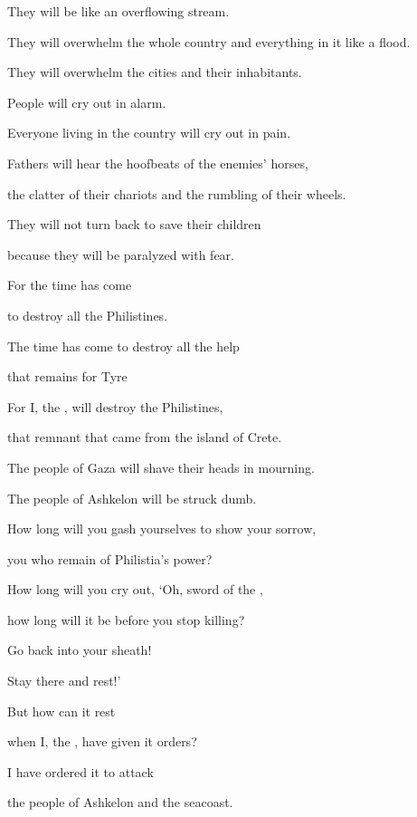 {\par }{\Q They will be
like an overflowing
stream.
\par }{\Q They will overwhelm
the whole country
and everything
in it like a flood.
\par }{\Q They will overwhelm the cities
and their inhabitants.
\par }{\Q People
will cry
out in alarm.
\par }{\Q Everyone
living
in the country
will cry out in pain.
\par }{\Q {}Fathers
will hear
the hoofbeats
of the enemies’ horses,
\par }{\Q the clatter
of their chariots
and the rumbling
of their wheels.
\par }{\Q They will not
turn back
to
save their children
\par }{\Q because they will be paralyzed
with fear.
\par }{\Q {}For
the time
has come
\par }{\Q to destroy
all
the Philistines.
\par }{\Q The time has come to destroy
all
the help
\par }{\Q that remains
for Tyre
\par }{\Q For
I, the
{}, will destroy
the Philistines,
\par }{\Q that remnant
that came from the island
of Crete.
\par }{\Q {}The people of Gaza
will shave
their heads in mourning.
\par }{\Q The people of Ashkelon
will be struck dumb.
\par }{\Q How
long
will you gash
yourselves to show your sorrow,

\par }{\Q you who remain
of Philistia’s power?
\par }{\Q {}How long
will you cry out, ‘Oh,
sword
of the
{},
\par }{\Q how long
will it be before you stop killing?

\par }{\Q Go back
into
your sheath!
\par }{\Q Stay
there and rest!’
\par }{\Q {}But how
can it rest
\par }{\Q when I, the
{}, have given it orders?
\par }{\Q I have ordered
it to
attack
\par }{\Q the people of Ashkelon
and the seacoast.

}

